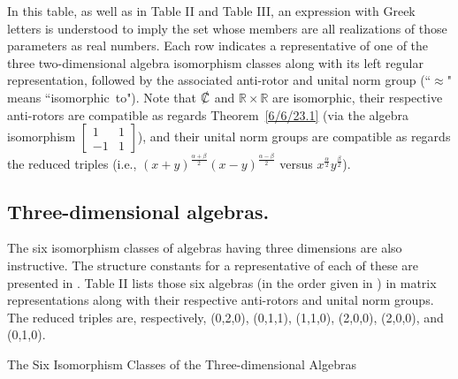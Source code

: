 \documentclass{amsart}
\theoremstyle{definition}
\numberwithin{theorem}{section}
\numberwithin{equation}{section}
\begin{document}
\bigskip


 {\small In this table, as well as in Table II and Table III, an expression with Greek letters is understood to imply the set whose members are all realizations of those parameters as real numbers.  Each row indicates a representative  of one of the three two-dimensional algebra isomorphism classes along with its left regular representation, followed by the associated anti-rotor and unital norm group (``$\approx$" means \mbox{``isomorphic to"}). Note that  $\slashed{\mathbb{C}}$ and $\mathbb{R}\times\mathbb{R}$ are isomorphic, their respective anti-rotors are compatible as regards \mbox{Theorem \ref{6/6/23.1}} (via the algebra isomorphism $\left[\begin{array}{ccc}
 1 & 1   \\ 
 -1 & 1    
\end{array}\right]$), and their unital norm groups are  compatible as regards the reduced triples (i.e., $(x+y)^{\frac{\alpha+\beta}{2}}(x-y)^{\frac{\alpha-\beta}{2}}$ versus $x^\frac{\alpha}{2} y^\frac{\beta}{2}$).}

\vspace{2cm} 

\subsection{Three-dimensional algebras.} The six isomorphism classes of  algebras having three dimensions are also instructive.  The structure constants for a representative of each of these are presented in \cite{kobayashi:2021}.  Table II lists those six algebras (in the order given in \cite{kobayashi:2021}) in matrix representations along with their respective anti-rotors and unital norm groups. The  reduced triples are, respectively, (0,2,0), (0,1,1), (1,1,0), (2,0,0), (2,0,0), and (0,1,0).

\vfill
\hspace{0pt}
\pagebreak


\hspace{0pt}
\vfill

  \centerline{\large The Six Isomorphism Classes of the Three-dimensional Algebras }

\vspace{.5cm}
\end{document}
